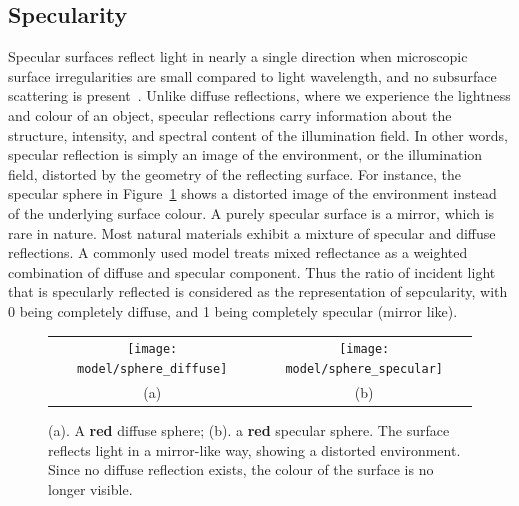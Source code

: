 
\subsection{Specularity}
Specular surfaces reflect light in nearly a single direction when microscopic surface irregularities are small compared to light wavelength, and no subsurface scattering is present~\cite{nayar1989surface}. Unlike diffuse reflections, where we experience the lightness and colour of an object, specular reflections carry information about the structure, intensity, and spectral content of the illumination field. In other words, specular reflection is simply an image of the environment, or the illumination field, distorted by the geometry of the reflecting surface. For instance, the specular sphere in Figure~\ref{fig:spec_ref} shows a distorted image of the environment instead of the underlying surface colour. A purely specular surface is a mirror, which is rare in nature. Most natural materials exhibit a mixture of specular and diffuse reflections. A commonly used model treats mixed reflectance as a weighted combination of diffuse and specular component. Thus the ratio of incident light that is specularly reflected is considered as the representation of sepcularity, with 0 being completely diffuse, and 1 being completely specular (mirror like).
\begin{figure}[!htbp]
\centering
\begin{tabular}{cc}
\texttt{[image: model/sphere\_diffuse]}&
\texttt{[image: model/sphere\_specular]}\\
(a) & (b)\\
\end{tabular}
\caption{(a). A \textbf{red} diffuse sphere; (b). a \textbf{red} specular sphere. The surface reflects light in a mirror-like way, showing a distorted environment. Since no diffuse reflection exists, the colour of the surface is no longer visible.}
\label{fig:spec_ref}
\end{figure}

